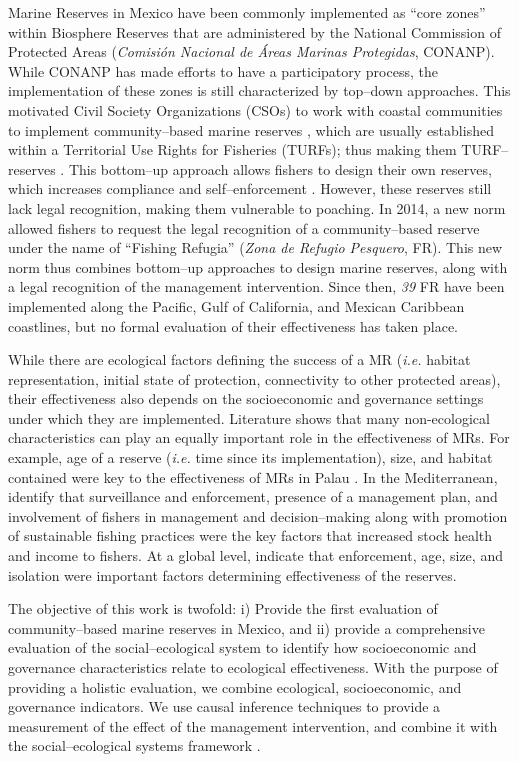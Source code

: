 \documentclass{frontiersSCNS}
\theoremstyle{definition}
\theoremstyle{definition}
\theoremstyle{definition}
\theoremstyle{remark}
\begin{document}
Marine Reserves in Mexico have been commonly implemented as ``core
zones'' within Biosphere Reserves that are administered by the National
Commission of Protected Areas (\emph{Comisión Nacional de Áreas Marinas
Protegidas}, CONANP). While CONANP has made efforts to have a
participatory process, the implementation of these zones is still
characterized by top--down approaches. This motivated Civil Society
Organizations (CSOs) to work with coastal communities to implement
community--based marine reserves \citep{uribe_2010-u2}, which are
usually established within a Territorial Use Rights for Fisheries
(TURFs); thus making them TURF--reserves \citep{afflerbach_2014-HP}.
This bottom--up approach allows fishers to design their own reserves,
which increases compliance and self--enforcement
\citep{gelcich_2015-Gw,espinosaromero_2014-PY,beger_2004-Y8}. However,
these reserves still lack legal recognition, making them vulnerable to
poaching. In 2014, a new norm \citep{nom} allowed fishers to request the
legal recognition of a community--based reserve under the name of
``Fishing Refugia'' (\emph{Zona de Refugio Pesquero}, FR). This new norm
thus combines bottom--up approaches to design marine reserves, along
with a legal recognition of the management intervention. Since then,
\emph{39} FR have been implemented along the Pacific, Gulf of
California, and Mexican Caribbean coastlines, but no formal evaluation
of their effectiveness has taken place.

While there are ecological factors defining the success of a MR
(\emph{i.e.} habitat representation, initial state of protection,
connectivity to other protected areas), their effectiveness also depends
on the socioeconomic and governance settings under which they are
implemented. Literature shows that many non-ecological characteristics
can play an equally important role in the effectiveness of MRs. For
example, age of a reserve (\emph{i.e.} time since its implementation),
size, and habitat contained were key to the effectiveness of MRs in
Palau \citep{friedlander_2017-oI}. In the Mediterranean,
\citet{difranco_2016-Xw} identify that surveillance and enforcement,
presence of a management plan, and involvement of fishers in management
and decision--making along with promotion of sustainable fishing
practices were the key factors that increased stock health and income to
fishers. At a global level, \citet{edgar_2014-UO} indicate that
enforcement, age, size, and isolation were important factors determining
effectiveness of the reserves.

The objective of this work is twofold: i) Provide the first evaluation
of community--based marine reserves in Mexico, and ii) provide a
comprehensive evaluation of the social--ecological system to identify
how socioeconomic and governance characteristics relate to ecological
effectiveness. With the purpose of providing a holistic evaluation, we
combine ecological, socioeconomic, and governance indicators. We use
causal inference techniques to provide a measurement of the effect of
the management intervention, and combine it with the social--ecological
systems framework \citep{ostrom_2009-hg}.
\end{document}
